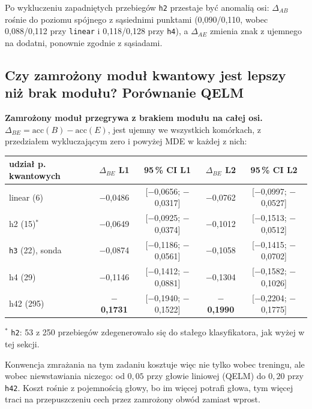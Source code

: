 \documentclass[11pt, a4paper]{article}
\begin{document}
Po wykluczeniu zapadniętych przebiegów \texttt{h2} przestaje być anomalią osi: $\Delta_{AB}$ rośnie do poziomu spójnego z sąsiednimi punktami (0,090/0,110, wobec 0,088/0,112 przy \texttt{linear} i 0,118/0,128 przy \texttt{h4}), a $\Delta_{AE}$ zmienia znak z ujemnego na dodatni, ponownie zgodnie z sąsiadami. 

\subsection{Czy zamrożony moduł kwantowy jest lepszy niż brak modułu? Porównanie QELM}\label{sec:be}

\textbf{Zamrożony moduł przegrywa z brakiem modułu na całej osi.} $\Delta_{BE} = \text{acc}(B) - \text{acc}(E)$, jest ujemny we wszystkich komórkach, z przedziałem wykluczającym zero i powyżej MDE w każdej z nich:

\begin{table}[H]
\centering
\renewcommand{\arraystretch}{1.3}
\begin{tabular}{lcccc}
\toprule
\textbf{udział p. kwantowych} & $\Delta_{BE}$ \textbf{L1} & \textbf{95\,\% CI L1} & $\Delta_{BE}$ \textbf{L2} & \textbf{95\,\% CI L2} \\
\midrule
linear (6) & $-$0,0486 & [$-$0,0656; $-$0,0317] & $-$0,0762 & [$-$0,0997; $-$0,0527] \\
h2 (15)$^{*}$ & $-$0,0649 & [$-$0,0925; $-$0,0374] & $-$0,1012 & [$-$0,1513; $-$0,0512] \\
\texttt{h3} (22), sonda & $-$0,0874 & [$-$0,1186; $-$0,0561] & $-$0,1058 & [$-$0,1415; $-$0,0702] \\
h4 (29) & $-$0,1146 & [$-$0,1412; $-$0,0881] & $-$0,1304 & [$-$0,1582; $-$0,1026] \\
h42 (295) & \textbf{$-$0,1731} & [$-$0,1940; $-$0,1522] & \textbf{$-$0,1990} & [$-$0,2204; $-$0,1775] \\
\bottomrule
\end{tabular}
\begin{minipage}{\textwidth}
\footnotesize $^{*}$ \texttt{h2}: 53 z 250 przebiegów zdegenerowało się do stałego klasyfikatora, jak wyżej w tej sekcji.
\end{minipage}
\end{table}

Konwencja zmrażania na tym zadaniu kosztuje więc nie tylko wobec treningu, ale wobec niewstawiania niczego: od $0{,}05$ przy głowie liniowej (QELM) do $0{,}20$ przy \texttt{h42}. Koszt rośnie z pojemnością głowy, bo im więcej potrafi głowa, tym więcej traci na przepuszczeniu cech przez zamrożony obwód zamiast wprost. 
\end{document}
